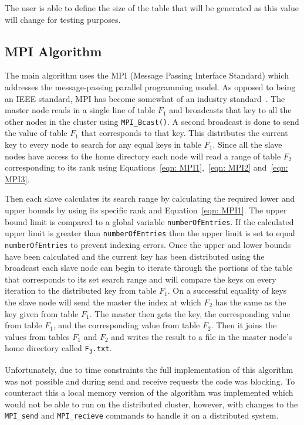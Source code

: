 \documentclass[10pt, conference]{IEEEtran}
\def\code#1{\texttt{#1}}
\begin{document}
The user is able to define the size of the table that will be generated as this value will change for testing purposes.

\subsection{MPI Algorithm}
\label{sec: MPI Algorithm}
The main algorithm uses the MPI (Message Passing Interface Standard) which addresses the message-passing parallel programming model. As opposed to being an IEEE standard, MPI has become somewhat of an industry standard~\cite{MPI}. The master node reads in a single line of table $F_1$ and broadcasts that key to all the other nodes in the cluster using \code{MPI\_Bcast()}. A second broadcast is done to send the value of table $F_1$ that corresponds to that key. This distributes the current key to every node to search for any equal keys in table $F_1$. Since all the slave nodes have access to the home directory each node will read a range of table $F_2$ corresponding to its rank using Equations~\ref{eqn: MPI1},~\ref{eqn: MPI2} and~\ref{eqn: MPI3}.

Then each slave calculates its search range by calculating the required lower and upper bounds by using its specific rank and Equation~\ref{eqn: MPI1}. The upper bound limit is compared to a global variable \code{numberOfEntries}. If the calculated upper limit is greater than \code{numberOfEntries} then the upper limit is set to equal \code{numberOfEntries} to prevent indexing errors. Once the upper and lower bounds have been calculated and the current key has been distributed using the broadcast each slave node can begin to iterate through the portions of the table that corresponds to its set search range and will compare the keys on every iteration to the distributed key from table $F_1$. On a successful equality of keys the slave node will send the master the index at which $F_2$ has the same as the key given from table $F_1$. The master then gets the key, the corresponding value from table $F_1$, and the corresponding value from table $F_2$. Then it joins the values from tables $F_1$ and $F_2$ and writes the result to a file in the master node’s home directory called \code{F\textsubscript{3}.txt}.

Unfortunately, due to time constraints the full implementation of this algorithm was not possible and during send and receive requests the code was blocking. To counteract this a local memory version of the algorithm was implemented which would not be able to run on the distributed cluster, however, with changes to the \code{MPI\_send} and \code{MPI\_recieve} commands to handle it on a distributed system.
\end{document}
